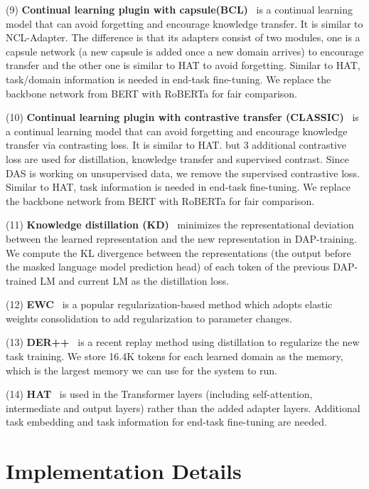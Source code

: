 \documentclass{article} \usepackage{iclr2023_conference,times}
\begin{document}
(9) \textbf{Continual learning plugin with capsule(BCL)}~\cite{ke2021adapting} is a continual learning model that can avoid forgetting and encourage knowledge transfer. It is similar to NCL-Adapter. The difference is that its adapters consist of two modules, one is a capsule network (a new capsule is added once a new domain arrives) to encourage transfer and the other one is similar to HAT to avoid forgetting. Similar to HAT, task/domain information is needed in end-task fine-tuning. We replace the backbone network from BERT with RoBERTa for fair comparison. 

(10) \textbf{Continual learning plugin with contrastive transfer (CLASSIC)}~\cite{ke2021Classic} is a continual learning model that can avoid forgetting and encourage knowledge transfer via contrasting loss. It is similar to HAT. but 3 additional contrastive loss are used for distillation, knowledge transfer and supervised contrast. Since DAS is working on unsupervised data, we remove the supervised contrastive loss. Similar to HAT, task information is needed in end-task fine-tuning. We replace the backbone network from BERT with RoBERTa for fair comparison. 

(11) \textbf{Knowledge distillation (KD)}~\cite{hinton2015distilling}
minimizes the representational deviation between the learned representation and the new representation in DAP-training. We
compute the KL divergence between the representations (the output before the masked language model prediction head) of each token of the previous DAP-trained LM and current LM as the distillation loss.

(12) \textbf{EWC}~\cite{buzzega2020dark} is a popular
regularization-based method which adopts elastic weights consolidation to add  regularization to parameter changes.

(13) \textbf{DER++}~\cite{buzzega2020dark} is a recent replay method using distillation to regularize the new task training. We store 16.4K tokens for each learned domain as the memory, which is the largest memory we can use for the system to run.

(14) \textbf{HAT}~\cite{Serra2018overcoming} is used in the Transformer layers (including self-attention, intermediate and output layers) rather than the added adapter layers. Additional task embedding and task information for end-task fine-tuning are needed.







\section{Implementation Details}
\label{ap:imp_detail}
\end{document}
